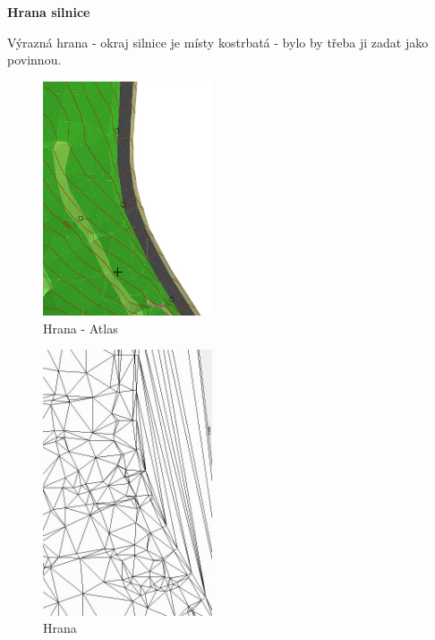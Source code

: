 \documentclass[a4paper, 12pt]{article}
\begin{document}
\textbf{Hrana silnice}

Výrazná hrana - okraj silnice je místy kostrbatá - bylo by třeba ji zadat jako povinnou.

\begin{figure}[h]
	\centering
	\includegraphics[width=5cm]{hrana_atlas.jpg}
	\caption{Hrana - Atlas}
\end{figure}

\begin{figure}[h]
	\centering
	\includegraphics[width=5cm]{hrana_nase.jpg}
	\caption{Hrana}
\end{figure}

\clearpage
\end{document}
